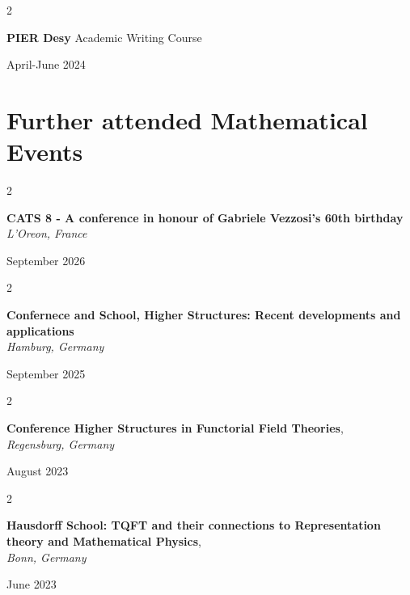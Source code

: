 \documentclass[10pt, letterpaper]{article}
\newenvironment{twocolentry}[2][]{
    \onecolentry
    \def\secondColumn{#2}
    \setcolumnwidth{\fill, 4.5 cm}
    \begin{paracol}{2}
}{
    \switchcolumn \raggedleft \secondColumn
    \end{paracol}
    \endonecolentry
} %
\begin{document}
\vspace*{0.2cm}


 \begin{twocolentry}
 {April-June 2024}

      \textbf{PIER Desy} Academic Writing Course

 \end{twocolentry}
    







 \section{Further attended Mathematical Events}

\begin{twocolentry}{

    September 2026}
\textbf{CATS 8 - A conference in honour of Gabriele Vezzosi's 60th birthday} \\
\textit{L'Oreon, France}

\end{twocolentry}

\vspace{0.2cm}

\begin{twocolentry}{

    September 2025}
\textbf{Confernece and School, Higher Structures:
Recent developments and applications} \\
\textit{Hamburg, Germany}

\end{twocolentry}

\vspace{0.2cm}

 \begin{twocolentry}{

    August 2023
           
        }
            \textbf{Conference Higher Structures in Functorial Field Theories}, \\
            \textit{Regensburg, Germany}
            
           
        \end{twocolentry}
                
 \vspace{0.2cm}

\begin{twocolentry}{

    June 2023
           
        }
            \textbf{Hausdorff School: TQFT and their connections to Representation theory and Mathematical Physics}, \\
            \textit{Bonn, Germany}
            
           
        \end{twocolentry}
        
\end{document}
